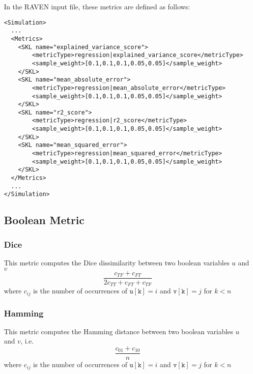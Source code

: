
In the RAVEN input file, these metrics are defined as follows:
\begin{lstlisting}[style=XML]
<Simulation>
  ...
  <Metrics>
    <SKL name="explained_variance_score">
        <metricType>regression|explained_variance_score</metricType>
        <sample_weight>[0.1,0.1,0.1,0.05,0.05]</sample_weight>
    </SKL>
    <SKL name="mean_absolute_error">
        <metricType>regression|mean_absolute_error</metricType>
        <sample_weight>[0.1,0.1,0.1,0.05,0.05]</sample_weight>
    </SKL>
    <SKL name="r2_score">
        <metricType>regression|r2_score</metricType>
        <sample_weight>[0.1,0.1,0.1,0.05,0.05]</sample_weight>
    </SKL>
    <SKL name="mean_squared_error">
        <metricType>regression|mean_squared_error</metricType>
        <sample_weight>[0.1,0.1,0.1,0.05,0.05]</sample_weight>
    </SKL>
  </Metrics>
  ...
</Simulation>
\end{lstlisting}

\subsection{Boolean Metric}
\label{subsection:boolean}

\subsubsection{Dice}
This metric computes the Dice dissimilarity between two boolean variables $u$ and $v$
\begin{equation}
  \frac{c_{TF} + c_{FT}}{2c_{TT} + c_{FT} + c_{TF}}
\end{equation}
where $c_{ij}$ is the number of occurrences of $\mathtt{u[k]} = i$ and $\mathtt{v[k]} = j$ for $k < n$


\subsubsection{Hamming}
This metric computes the Hamming distance between two boolean variables $u$ and $v$, i.e.
\begin{equation}
  \frac{c_{01} + c_{10}}{n}
\end{equation}
where $c_{ij}$ is the number of occurrences of $\mathtt{u[k]} = i$ and $\mathtt{v[k]} = j$ for $k < n$

